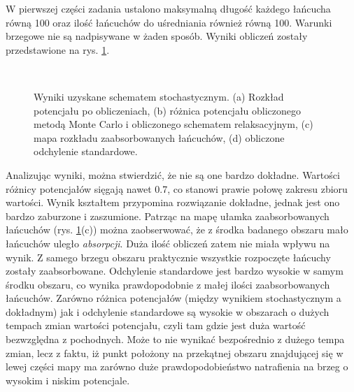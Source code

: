 \documentclass[a4paper, 12pt]{article}
\begin{document}
	W pierwszej części zadania ustalono maksymalną długość każdego łańcucha równą 100 oraz ilość łańcuchów do uśredniania również równą 100.
	Warunki brzegowe nie są nadpisywane w żaden sposób. Wyniki obliczeń zostały przedstawione na rys. \ref{task_1}.
		\begin{figure}[h]
		\centering
		\begin{subfigure}{0.49\textwidth}
			\centering
			
			\caption{}		
		\end{subfigure}
		\begin{subfigure}{0.49\textwidth}
			\centering
			
			\caption{}		
		\end{subfigure}
		\\
				\begin{subfigure}{0.49\textwidth}
			\centering
			
			\caption{}		
		\end{subfigure}
		\begin{subfigure}{0.49\textwidth}
			\centering
			
			\caption{}		
		\end{subfigure}
		\caption{Wyniki uzyskane schematem stochastycznym. (a) Rozkład potencjału po obliczeniach, (b) różnica potencjału obliczonego metodą Monte Carlo i obliczonego schematem relaksacyjnym, (c) mapa rozkładu zaabsorbowanych łańcuchów, (d) obliczone odchylenie standardowe.}
		\label{task_1}
	\end{figure}
	Analizując wyniki, można stwierdzić, że nie są one bardzo dokładne. Wartości różnicy potencjałów sięgają nawet 0.7, co stanowi prawie połowę zakresu zbioru wartości. Wynik kształtem przypomina rozwiązanie dokładne, jednak jest ono bardzo zaburzone i zaszumione.
	Patrząc na mapę ułamka zaabsorbowanych łańcuchów (rys. \ref{task_1}(c)) można zaobserwować, że z środka badanego obszaru mało łańcuchów uległo \textit{absorpcji}.
	Duża ilość obliczeń zatem nie miała wpływu na wynik.
	Z samego brzegu obszaru praktycznie wszystkie rozpoczęte łańcuchy zostały zaabsorbowane.
	Odchylenie standardowe jest bardzo wysokie w samym środku obszaru, co wynika prawdopodobnie z małej ilości zaabsorbowanych łańcuchów.
	Zarówno różnica potencjałów (między wynikiem stochastycznym a dokładnym) jak i odchylenie standardowe są wysokie w obszarach o dużych tempach zmian wartości potencjału, czyli tam gdzie jest duża wartość bezwzględna z pochodnych.
	Może to nie wynikać bezpośrednio z dużego tempa zmian, lecz z faktu, iż punkt położony na przekątnej obszaru znajdującej się w lewej części mapy ma zarówno duże prawdopodobieństwo natrafienia na brzeg o wysokim i niskim potencjale. 
\end{document}
